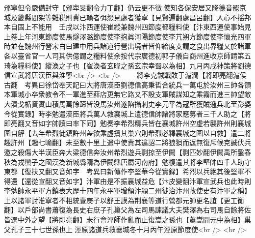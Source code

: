 邠寧但令嚴備封守【邠卑旻翻令力丁翻】仍云更不徵使知各保安居又降德音罷京城及畿縣間架等雜税則冀已輸者弭怨見處者獲寧【見賢遍翻處昌呂翻】人心不揺邦本自固上不能用　壬戌以汴西運使崔縱兼魏州四節度都糧料使【汴東西運使事始見上卷上年河東節度使馬燧澤潞節度使李抱眞河陽節度使李芁朔方節度使李懷光四軍時並在魏州行營宋白曰建中用兵諸道行營出境者皆仰給度支謂之食出界糧又於諸軍各以臺省官一人司其供億謂之糧料使余按代宗廣德初郭子儀自商州進收京師請第五琦為糧料使】縱渙之子也【崔渙者玄暐之孫玄宗幸蜀以為相】九月丙戌神策將劉德信宣武將唐漢臣與淮寧<br />
<br />
　　將李克誠戰敗于滬澗【將即亮翻滬侯古翻　考異曰徐岱奉天記曰大將唐漢臣劉德信高秉哲合統兵一萬屯於汝州三帥各領本軍城小卒衆教令不一軍進至薛店更無它路又不設支軍賊謀知之乘霧而進三帥望敵大潰戈楯資實山積馬萬餘蹄皆没馬汝州遂陷攝刺史李元平為寇所獲賊邏兵北至彭婆今從實録】時李勉遣漢臣將兵萬人救襄城上遣德信帥諸將家應募者三千人助之【將即亮翻又音如字帥讀曰率下同】勉奏李希烈精兵皆在襄城許州空虛若襲許州則襄城圍自解【去年希烈徙鎮許州盖欲乘虚擣其巢穴則希烈必釋襄城之圍以自救】遣二將趣許州【趣七喻翻】未至數十里上遣中使責其違詔二將狼狽而返無復斥候克誠伏兵邀之殺傷大半漢臣奔大梁德信奔汝州希烈遊兵剽掠至伊闕【剽匹妙翻伊闕禹所鑿春秋為戎蠻子之國漢為新城縣隋為伊闕縣唐屬河南府】勉復遣其將李堅帥四千人助守東都【復扶又翻又音如字　考異曰新傳作李堅華今從實録】希烈以兵絶其後堅軍不得還【還從宣翻又音如字】汴軍由是不振襄城益危【汴皮變翻汴軍宣武兵也此時則李勉帥永平軍方鎮表大歷十四年永平軍增領汴潁二州徙治汴州故使史有汴軍之稱】　上以諸軍討淮寧者不相統壹庚子以舒王謨為荆襄等道行營都元帥更名誼【更工衡翻】以戶部尚書蕭復為長史右庶子孔巢父為左司馬諫議大夫樊澤為右司馬自餘將佐皆選中外之望【將即亮翻】未行會涇師作亂而止復嵩之孫也【蕭嵩開元中為相】巢父孔子三十七世孫也上涇原諸道兵救襄城冬十月丙午涇原節度使<br />
<br />
